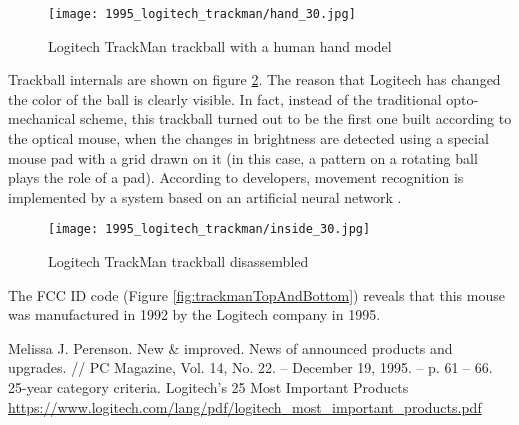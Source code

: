 \documentclass[11pt, a4paper]{article}
\begin{document}
\begin{figure}[h]
    \centering
    \texttt{[image: 1995\_logitech\_trackman/hand\_30.jpg]}
    \caption{Logitech TrackMan trackball with a human hand model}
    \label{fig:trackmanHand}
\end{figure}

Trackball internals are shown on figure \ref{fig:trackmanInside}. The reason that Logitech has changed the color of the ball is clearly visible. In fact, instead of the traditional opto-mechanical scheme, this trackball turned out to be the first one built according to the optical mouse, when the changes in brightness are detected using a special mouse pad with a grid drawn on it (in this case, a pattern on a rotating ball plays the role of a pad). According to developers, movement recognition is implemented by a system based on an artificial neural network \cite{marbleAdv}.

\begin{figure}[h]
    \centering
    \texttt{[image: 1995\_logitech\_trackman/inside\_30.jpg]}
    \caption{Logitech TrackMan trackball disassembled}
    \label{fig:trackmanInside}
\end{figure}

 The FCC ID code (Figure \ref{fig:trackmanTopAndBottom}) reveals that this mouse was manufactured in 1992 by the Logitech company in 1995.


\begin{thebibliography}{9}
 Melissa J. Perenson. New \& improved. News of announced products and upgrades. // PC Magazine, Vol. 14, No. 22. -- December 19, 1995. -- p. 61 -- 66.
 25-year category criteria. Logitech’s 25 Most Important Products \url{https://www.logitech.com/lang/pdf/logitech_most_important_products.pdf}
\end{thebibliography}
\end{document}
